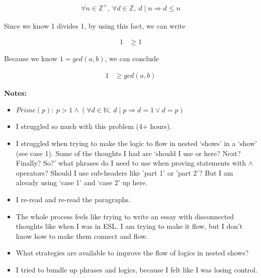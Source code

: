 \documentclass[12pt]{article}
\begin{document}
\begin{enumerate}[a.]
\begin{mdframed}
\begin{enumerate}[1.]
\begin{mdframed}
            \begin{align}
                \forall n \in \mathbb{Z}^{+},\:\forall d \in \mathbb{Z},\:d \mid n \Rightarrow d \leq n
            \end{align}

            Since we know 1 divides 1, by using this fact, we can write

            \begin{align}
                1 &\geq 1
            \end{align}

            Because we know $1 = gcd(a,b)$, we can conclude

            \begin{align}
                1 &\geq gcd(a,b)
            \end{align}

            \end{mdframed}

        \end{enumerate}

    \end{mdframed}

    \bigskip

    \textbf{Notes:}

    \begin{itemize}
        \item $Prime(p):\:p > 1 \land (\forall d \in \mathbb{N},\:d \mid p \Rightarrow d = 1 \lor d = p)$
        \item I struggled so much with this problem (4+ hours).
        \item I struggled when trying to make the logic to flow in nested `shows' in a `show' (see case 1).
        Some of the thoughts I had are `should I use or here? Next? Finally? So?' what phrases do I need
        to use when proving statements with $\land$ operators? Should I use sub-headers like 'part 1' or 'part 2'?
        But I am already using `case 1' and `case 2' up here.
        \item I re-read and re-read the paragraphs.
        \item The whole process feels like trying to write an essay with disconnected thoughts like
        when I was in ESL. I am trying to make it flow, but I don't know how to make them connect and flow.
        \item What strategies are available to improve the flow of logics in nested shows?
        \item I tried to bundle up phrases and logics, because I felt like I
        was losing control.
    \end{itemize}
\end{enumerate}
\end{document}
